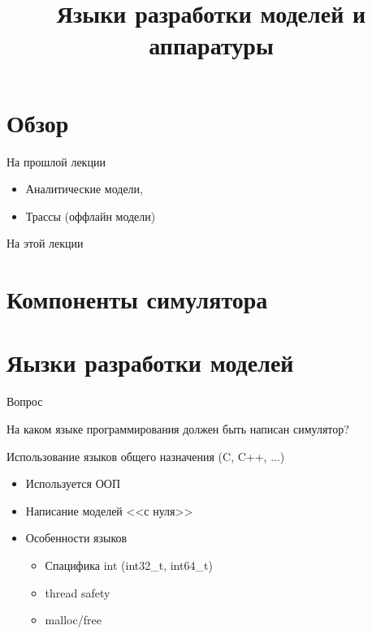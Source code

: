 

\title{Языки разработки моделей и аппаратуры}



\begin{frame}
\titlepage
\end{frame}

\section*{Обзор}

\begin{frame}{На прошлой лекции}

\begin{itemize}
  \item Аналитические модели,
  \item Трассы (оффлайн модели)
\end{itemize}

\end{frame}

\begin{frame}{На этой лекции}
\tableofcontents
\end{frame} 

\section{Компоненты симулятора}

\begin{frame}

\begin{figure}[htp]
    \centering
\end{figure}

\end{frame}

\section{Яызки разработки моделей}

\begin{frame}{Вопрос}

На каком языке программирования должен быть написан симулятор?

\end{frame}

\begin{frame}{Использование языков общего назначения (C, C++, ...)}

\begin{itemize}
  \item Используется ООП
  \item Написание моделей <<с нуля>>
  \item Особенности языков
  \begin{itemize}
    \item Спацифика int (int32\_t, int64\_t)
    \item thread safety
    \item malloc/free
  \end{itemize}
\end{itemize}

\end{frame}

